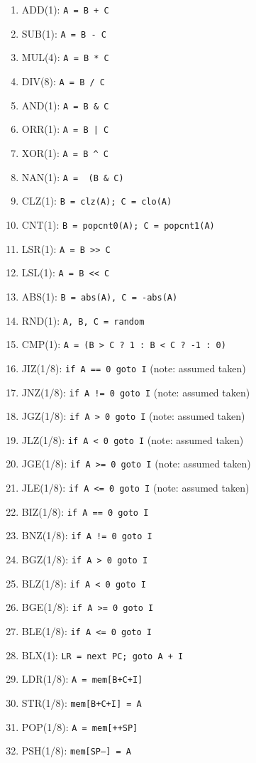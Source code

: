 \documentclass{article}
\begin{document}
\begin{enumerate}[noitemsep]
    \item ADD(1): \texttt{A = B + C}
    \item SUB(1): \texttt{A = B - C}
    \item MUL(4): \texttt{A = B * C}
    \item DIV(8): \texttt{A = B / C}
    \item AND(1): \texttt{A = B \& C}
    \item ORR(1): \texttt{A = B | C}
    \item XOR(1): \texttt{A = B \^{} C}
    \item NAN(1): \texttt{A = ~(B \& C)}
    \item CLZ(1): \texttt{B = clz(A); C = clo(A)}
    \item CNT(1): \texttt{B = popcnt0(A); C = popcnt1(A)}
    \item LSR(1): \texttt{A = B >> C}
    \item LSL(1): \texttt{A = B << C}
    \item ABS(1): \texttt{B = abs(A), C = -abs(A)}
    \item RND(1): \texttt{A, B, C = random}
    \item CMP(1): \texttt{A = (B > C ? 1 : B < C ? -1 : 0)}
    \item JIZ(1/8): \texttt{if A == 0 goto I} (note: assumed taken)
    \item JNZ(1/8): \texttt{if A != 0 goto I} (note: assumed taken)
    \item JGZ(1/8): \texttt{if A > 0 goto I} (note: assumed taken)
    \item JLZ(1/8): \texttt{if A < 0 goto I} (note: assumed taken)
    \item JGE(1/8): \texttt{if A >= 0 goto I} (note: assumed taken)
    \item JLE(1/8): \texttt{if A <= 0 goto I} (note: assumed taken)
    \item BIZ(1/8): \texttt{if A == 0 goto I}
    \item BNZ(1/8): \texttt{if A != 0 goto I}
    \item BGZ(1/8): \texttt{if A > 0 goto I}
    \item BLZ(1/8): \texttt{if A < 0 goto I}
    \item BGE(1/8): \texttt{if A >= 0 goto I}
    \item BLE(1/8): \texttt{if A <= 0 goto I}
    \item BLX(1): \texttt{LR = next PC; goto A + I}
    \item LDR(1/8): \texttt{A = mem[B+C+I]}
    \item STR(1/8): \texttt{mem[B+C+I] = A}
    \item POP(1/8): \texttt{A = mem[++SP]}
    \item PSH(1/8): \texttt{mem[SP--] = A}
\end{enumerate}
\end{document}
